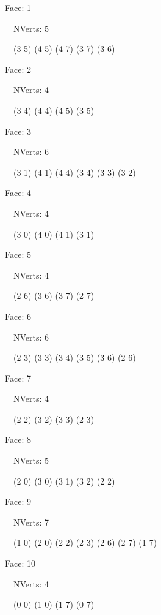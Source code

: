 \documentclass{article}
\begin{document}
{\footnotesize 

Face: 1

\   \    NVerts: 5

 \   \   (3 5) (4 5) (4 7) (3 7) (3 6)}

{\footnotesize 

Face: 2

\   \    NVerts: 4

 \   \   (3 4) (4 4) (4 5) (3 5)}

{\footnotesize 

Face: 3

\   \    NVerts: 6

 \   \   (3 1) (4 1) (4 4) (3 4) (3 3) (3 2)}

{\footnotesize 

Face: 4

\   \    NVerts: 4

 \   \   (3 0) (4 0) (4 1) (3 1)}

{\footnotesize 

Face: 5

\   \    NVerts: 4

 \   \   (2 6) (3 6) (3 7) (2 7)}

{\footnotesize 

Face: 6

\   \    NVerts: 6

 \   \   (2 3) (3 3) (3 4) (3 5) (3 6) (2 6)}

{\footnotesize 

Face: 7

\   \    NVerts: 4

 \   \   (2 2) (3 2) (3 3) (2 3)}

{\footnotesize 

Face: 8

\   \    NVerts: 5

 \   \   (2 0) (3 0) (3 1) (3 2) (2 2)}

{\footnotesize 

Face: 9

\   \    NVerts: 7

 \   \   (1 0) (2 0) (2 2) (2 3) (2 6) (2 7) (1 7)}

{\footnotesize 

Face: 10

\   \    NVerts: 4

 \   \   (0 0) (1 0) (1 7) (0 7)}


 \newpage
\end{document}
